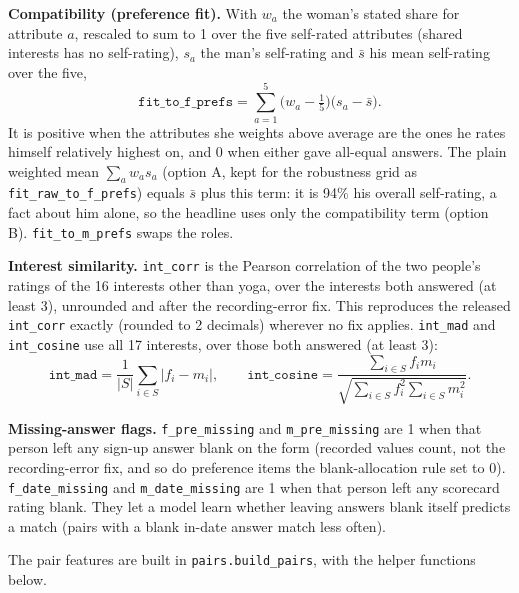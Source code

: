 \documentclass[11pt]{article}
\begin{document}
\textbf{Compatibility (preference fit).} With $w_a$ the woman's stated share for attribute $a$, rescaled to sum
to 1 over the five self-rated attributes (shared interests has no self-rating), $s_a$ the man's self-rating and
$\bar s$ his mean self-rating over the five,
\begin{equation}
\texttt{fit\_to\_f\_prefs} = \sum_{a=1}^{5} \Big(w_a - \tfrac15\Big)\big(s_a - \bar s\big).
\end{equation}
It is positive when the attributes she weights above average are the ones he rates himself relatively highest on,
and 0 when either gave all-equal answers. The plain weighted mean $\sum_a w_a s_a$ (option A, kept for the
robustness grid as \texttt{fit\_raw\_to\_f\_prefs}) equals $\bar s$ plus this term: it is 94\% his overall
self-rating, a fact about him alone, so the headline uses only the compatibility term (option B).
\texttt{fit\_to\_m\_prefs} swaps the roles.

\textbf{Interest similarity.} \texttt{int\_corr} is the Pearson correlation of the two people's ratings of the 16
interests other than yoga, over the interests both answered (at least 3), unrounded and after the recording-error
fix. This reproduces the released \texttt{int\_corr} exactly (rounded to 2 decimals) wherever no fix applies.
\texttt{int\_mad} and \texttt{int\_cosine} use all 17 interests, over those both answered (at least 3):
\[
\texttt{int\_mad} = \frac{1}{|S|}\sum_{i\in S} |f_i - m_i|, \qquad
\texttt{int\_cosine} = \frac{\sum_{i\in S} f_i m_i}{\sqrt{\sum_{i\in S} f_i^2 \sum_{i\in S} m_i^2}}.
\]

\textbf{Missing-answer flags.} \texttt{f\_pre\_missing} and \texttt{m\_pre\_missing} are 1 when that person left any
sign-up answer blank on the form (recorded values count, not the recording-error fix, and so do preference items the
blank-allocation rule set to 0). \texttt{f\_date\_missing} and \texttt{m\_date\_missing} are 1 when that person left
any scorecard rating blank. They let a model learn whether leaving answers blank itself predicts a match (pairs with
a blank in-date answer match less often).

The pair features are built in \texttt{pairs.build\_pairs}, with the helper functions below.
\end{document}
